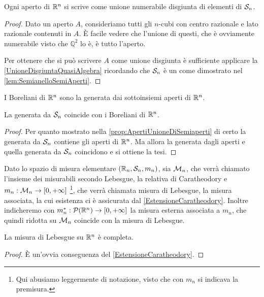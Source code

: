 \begin{proposition}\label{prop:ApertiUnioneDiSemiaperti}
	Ogni aperto di $\R^n$ si scrive come unione numerabile disgiunta di elementi di $\S_n$.
\end{proposition}
\begin{proof}
	Dato un aperto $A$, consideriamo tutti gli $n$-cubi con centro razionale e lato razionale contenuti in $A$.
	È facile vedere che l'unione di questi, che è ovviamente numerabile visto che $\mathbb Q^2$ lo è, è tutto l'aperto.
	
	Per ottenere che si può scrivere $A$ come unione disgiunta è sufficiente applicare la \cref{UnioneDisgiuntaQuasiAlgebra} ricordando che $\S_n$ è un \semiring{} come dimostrato nel \cref{lem:SemianelloSemiAperti}.
\end{proof}

\begin{definition}\label{def:Boreliani}
	I Boreliani di $\R^n$ sono la \sigalg{} generata dai sottoinsiemi aperti di $\R^n$.
\end{definition}

\begin{proposition}\label{SigAlgUgualeBoreliani}
	La \sigalg{} generata da $\S_n$ coincide con i Boreliani di $\R^n$.
\end{proposition}
\begin{proof}
	Per quanto mostrato nella \cref{prop:ApertiUnioneDiSemiaperti} di certo la \sigalg{} generata da $\S_n$ contiene gli aperti di $\R^n$.
	Ma allora la \sigalg{} generata dagli aperti e quella generata da $\S_n$ coincidono e si ottiene la tesi.
\end{proof}

\begin{definition}\label{LebesgueMisura}
	Dato lo spazio di misura elementare $(\R_n,\S_n,m_n)$, sia $\M_n$, che verrà chiamato l'insieme dei misurabili secondo Lebesgue, la relativa \sigalg{} di Caratheodory e $m_n:\M_n\to\Rpiu$ \footnote{Qui abusiamo leggermente di notazione, visto che con $m_n$ si indicava la premisura.}, che verrà chiamata misura di Lebesgue, la misura associata, la cui esistenza ci è assicurata dal \cref{EstensioneCaratheodory}. 
	Inoltre indicheremo con $m_n^*:\mathcal P(\R^n)\to\Rpiu$ la misura esterna associata a $m_n$, che quindi ridotta su $\M_n$ coincide con la misura di Lebesgue.
\end{definition}

\begin{remark}\label{nota:LebesgueCompletezza}
	La misura di Lebesgue su $\R^n$ è completa.
\end{remark}
\begin{proof}
	È un'ovvia conseguenza del \cref{EstensioneCaratheodory}.
\end{proof}

